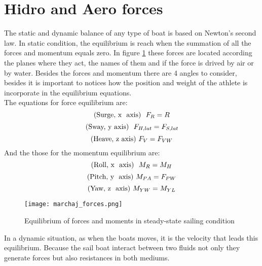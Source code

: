 \section{Hidro and Aero forces} \label{forces_sec}
The static and dynamic balance of any type of boat is based on Newton's second law. In static condition, the equilibrium is reach when the summation of all the forces and momentum equals zero. In figure \ref{forces_m} these forces are located according the planes where they act, the names of them and if the force is drived by air or by water. Besides the forces and momentum there are 4 angles to consider, besides it is important to notices how the position and weight of the athlete is incorporate in the equilibrium equations. \\

The equations for force equilibrium are:
\begin{equation}\label{eq:force_x}
    \text{(Surge, x  \space axis)  \space} F_{R}=R \\
\end{equation}
\begin{equation}\label{eq:force_y}
    \text{(Sway, y\space axis) \space } \space F_{H,lat}=F_{S,lat}\\
\end{equation}
\begin{equation}\label{eq:force_z}
    \text{(Heave, z\space axis)  } \space F_{V}=F_{VW}
\end{equation}
And the those for the momentum equilibrium are:
\begin{equation}\label{eq:m_x}
    \text{(Roll, x  \space axis) \space } M_{R}=M_{H} \\
\end{equation}
\begin{equation}\label{eq:m_y}
    \text{(Pitch, y \space axis)  } \space M_{PA}=F_{PW}\\
\end{equation}
\begin{equation}\label{eq:m_z}
    \text{(Yaw, z \space axis)  } \space M_{YW}=M_{YL}
\end{equation}

 \begin{figure}[ht]
\centering
  \texttt{[image: marchaj\_forces.png]}
 \caption{Equilibrium of forces and moments in steady-state sailing condition \cite{marchajaereo1979} }
\label{forces_m}
\end{figure}

In a dynamic situation, as when the boats moves, it is the velocity that leads this equilibrium. Because the sail boat interact between two fluids not only they generate forces but also resistances in both mediums.\\

